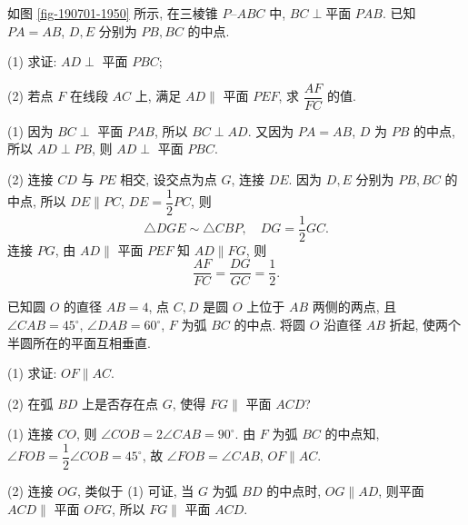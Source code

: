\begin{exercise}
    如图 \ref{fig-190701-1950} 所示, 在三棱锥 $P\text{--}ABC$ 中, $BC\perp\text{平面\ }PAB$. 已知 $PA=AB$, $D, E$ 分别为 $PB, BC$ 的中点.
    
    (1) 求证: $AD\perp$ 平面 $PBC$;
    
    (2) 若点 $F$ 在线段 $AC$ 上, 满足 $AD\parallel$ 平面 $PEF$, 求 $\dfrac{AF}{FC}$ 的值.
\end{exercise}
\beginsolution
    (1) 因为 $BC\perp$ 平面  $PAB$, 所以 $BC\perp AD$. 又因为 $PA=AB$, $D$ 为 $PB$ 的中点, 所以 $AD\perp PB$, 则 $AD\perp$ 平面 $PBC$.

    (2) 连接 $CD$ 与 $PE$ 相交, 设交点为点 $G$, 连接 $DE$. 
    因为 $D, E$ 分别为 $PB, BC$ 的中点, 所以 $DE\parallel PC$, $DE= \dfrac12 PC$, 则 
    \[\triangle DGE\sim \triangle CBP,\quad DG=\frac12 GC.\]
    连接 $PG$, 由 $AD\parallel$ 平面 $PEF$ 知 $AD\parallel FG$, 则
    \[\frac{AF}{FC}= \frac{DG}{GC}= \frac12.\]
\endsolution

\begin{exercise}
    已知圆 $O$ 的直径 $AB=4$, 点 $C, D$ 是圆 $O$ 上位于 $AB$ 两侧的两点, 且 $\angle CAB=45^\circ$, $\angle DAB=60^\circ$, $F$ 为弧 $BC$ 的中点. 将圆 $O$ 沿直径 $AB$ 折起, 使两个半圆所在的平面互相垂直.
    
    (1) 求证: $OF\parallel AC$.
    
    (2) 在弧 $BD$ 上是否存在点 $G$, 使得 $FG\parallel$ 平面 $ACD$?
\end{exercise}
\beginsolution
    (1) 连接 $CO$, 则 $\angle COB= 2\angle CAB= 90^\circ$. 由 $F$ 为弧 $BC$ 的中点知, $\angle FOB= \dfrac12\angle COB= 45^\circ$, 故 $\angle FOB= \angle CAB$, $OF\parallel AC$.
    
    (2) 连接 $OG$, 类似于 (1) 可证, 
    当 $G$ 为弧 $BD$ 的中点时, $OG\parallel AD$, 则平面 $ACD\parallel$ 平面 $OFG$, 所以 $FG\parallel$ 平面 $ACD$.
\endsolution